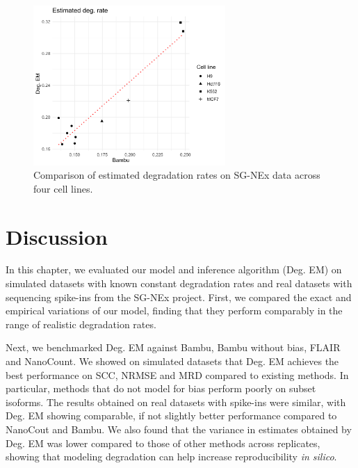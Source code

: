 \begin{figure}
    \centering
    \includegraphics[width=0.65\textwidth]{figures/real-deg-rate.png}
    \caption[Comparison of estimated degradation rates on SG-NEx data]{Comparison of estimated degradation rates on SG-NEx data across four cell lines.}
    \label{fig:real-deg-rate}
\end{figure}

\section{Discussion}

In this chapter, we evaluated our model and inference algorithm (Deg. EM) on simulated datasets with known constant degradation rates and real datasets with sequencing spike-ins from the SG-NEx project. First, we compared the exact and empirical variations of our model, finding that they perform comparably in the range of realistic degradation rates. 

Next, we benchmarked Deg. EM against Bambu, Bambu without bias, FLAIR and NanoCount. We showed on simulated datasets that Deg. EM achieves the best performance on SCC, NRMSE and MRD compared to existing methods. In particular, methods that do not model for bias perform poorly on subset isoforms. The results obtained on real datasets with spike-ins were similar, with Deg. EM showing comparable, if not slightly better performance compared to NanoCout and Bambu. We also found that the variance in estimates obtained by Deg. EM was lower compared to those of other methods across replicates, showing that modeling degradation can help increase reproducibility \textit{in silico}.   